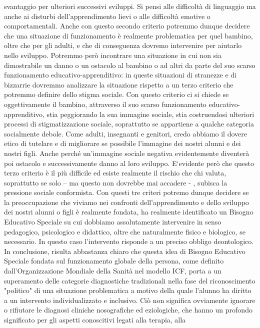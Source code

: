 svantaggio per ulteriori successivi sviluppi. Si pensi alle difficoltà di linguaggio ma anche ai disturbi
dell’apprendimento lievi o alle difficoltà emotive o comportamentali. Anche con questo secondo
criterio potremmo dunque decidere che una situazione di funzionamento è realmente
problematica per quel bambino, oltre che per gli adulti, e che di conseguenza dovremo intervenire
per aiutarlo nello sviluppo.
Potremmo però incontrare una situazione in cui non sia dimostrabile un danno o un ostacolo
al bambino o ad altri da parte del suo scarso funzionamento educativo-apprenditivo: in queste
situazioni di stranezze e di bizzarrie dovremmo analizzare la situazione rispetto a un terzo criterio
che potremmo definire dello stigma sociale. Con questo criterio ci si chiede se oggettivamente il
bambino, attraverso il suo scarso funzionamento educativo-apprenditivo, stia peggiorando la sua
immagine sociale, stia costruendosi ulteriori processi di stigmatizzazione sociale, soprattutto se
appartiene a qualche categoria socialmente debole. Come adulti, insegnanti e genitori, credo
abbiamo il dovere etico di tutelare e di migliorare se possibile l’immagine dei nostri alunni e dei
nostri figli. Anche perché un’immagine sociale negativa evidentemente diventerà poi ostacolo e
successivamente danno al loro sviluppo. E`evidente però che questo terzo criterio è il più difficile
ed esiste realmente il rischio che chi valuta, soprattutto se solo – ma questo non dovrebbe mai
accadere - , subisca la pressione sociale conformista.
Con questi tre criteri potremo dunque decidere se la preoccupazione che viviamo nei
confronti dell’apprendimento e dello sviluppo dei nostri alunni o figli è realmente fondata, ha
realmente identificato un Bisogno Educativo Speciale su cui dobbiamo assolutamente intervenire
in senso pedagogico, psicologico e didattico, oltre che naturalmente fisico e biologico, se
necessario. In questo caso l’intervento risponde a un preciso obbligo deontologico.
In conclusione, risulta abbastanza chiaro che questa idea di Bisogno Educativo Speciale
fondata sul funzionamento globale della persona, come definito dall’Organizzazione Mondiale
della Sanità nel modello ICF, porta a un superamento delle categorie diagnostiche tradizionali nella
fase del riconoscimento "politico" di una situazione problematica a motivo della quale l’alunno ha
diritto a un intervento individualizzato e inclusivo.
Ciò non significa ovviamente ignorare o rifiutare le diagnosi cliniche nosografiche ed
eziologiche, che hanno un profondo significato per gli aspetti conoscitivi legati alla terapia, alla
